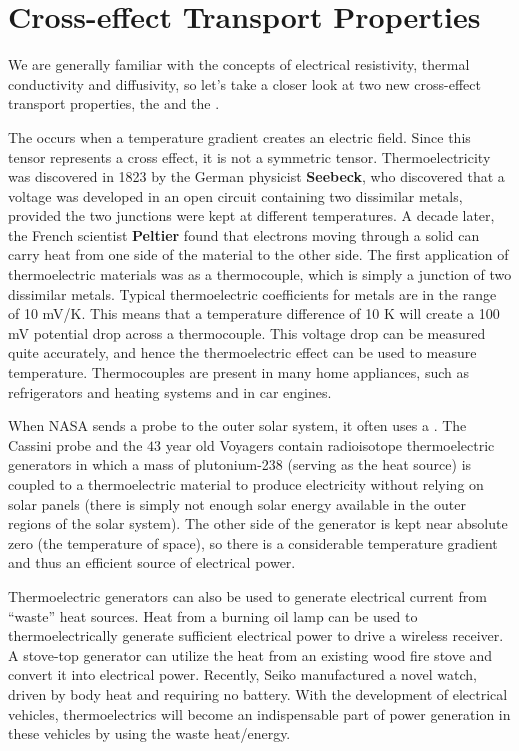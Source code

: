 \section{Cross-effect Transport Properties}\label{\chabbr:sec:PCtransport}

We are generally familiar with the concepts of electrical resistivity, thermal conductivity and diffusivity, so let's take a closer look at two new cross-effect transport properties, the  and the . 

The  occurs when a temperature gradient creates an electric field. Since this tensor represents a cross effect, it is not a symmetric tensor. Thermoelectricity was discovered in 1823 by the German physicist \textbf{Seebeck}, who discovered that a voltage was developed in an open circuit containing two dissimilar metals, provided the two junctions were kept at different temperatures. A decade later, the French scientist \textbf{Peltier} found that electrons moving through a solid can carry heat from one side of the material to the other side.  The first application of thermoelectric materials was  as a thermocouple, which is simply a junction of two dissimilar metals.  Typical thermoelectric coefficients for metals are in the range of 10 mV/K.  This means that a temperature difference of 10 K will create a 100 mV potential drop across a thermocouple.  This voltage drop can be measured quite accurately, and hence the thermoelectric effect can be used to measure temperature. Thermocouples are present in many home appliances, such as refrigerators and heating systems and in car engines.

When NASA sends a probe to the outer solar system, it often uses a . The Cassini probe and the $43$ year old Voyagers contain radioisotope thermoelectric generators in which a mass of plutonium-238 (serving as the heat source) is coupled to a thermoelectric material to produce  electricity without relying on solar panels (there is simply not enough solar energy available in the outer regions of the solar system).  The other side of the generator is kept near absolute zero (the temperature of space), so there is a considerable temperature gradient and thus an efficient source of electrical power.

Thermoelectric generators can also be used to generate electrical current from ``waste'' heat sources.  Heat from a burning oil lamp can be used to thermoelectrically generate sufficient electrical power to drive a wireless receiver. A stove-top generator can utilize the heat from an existing wood fire stove and convert it into electrical power. Recently, Seiko manufactured a novel watch, driven by body heat and requiring no battery. With the development of electrical vehicles, thermoelectrics will become an indispensable part of power generation in these vehicles by using the waste heat/energy.

